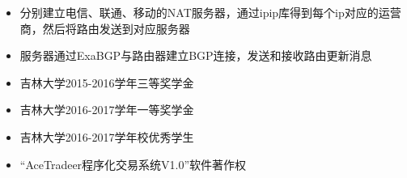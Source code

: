 \documentclass[12pt,a4paper,ragged2e]{altacv}
\begin{document}
\setlength{\baselineskip}{18pt}
\begin{itemize}
\justifying
\item 分别建立电信、联通、移动的NAT服务器，通过ipip库得到每个ip对应的运营商，然后将路由发送到对应服务器
\item 服务器通过ExaBGP与路由器建立BGP连接，发送和接收路由更新消息
\end{itemize}


\begin{itemize}
\item 吉林大学2015-2016学年三等奖学金
\item 吉林大学2016-2017学年一等奖学金
\item 吉林大学2016-2017学年校优秀学生
\item “AceTradeer程序化交易系统V1.0”软件著作权
\end{itemize}


\clearpage
\nocite{*}
\end{document}
